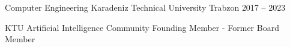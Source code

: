 
\begin{cventries}

  \cventry
    {Computer Engineering} %
    {Karadeniz Technical University} %
    {Trabzon} %
    {2017 – 2023} %
    {
      \begin{cvitems} %
        \item {KTU Artificial Intelligence Community Founding Member - Former Board Member}
      \end{cvitems}
    }
\end{cventries}